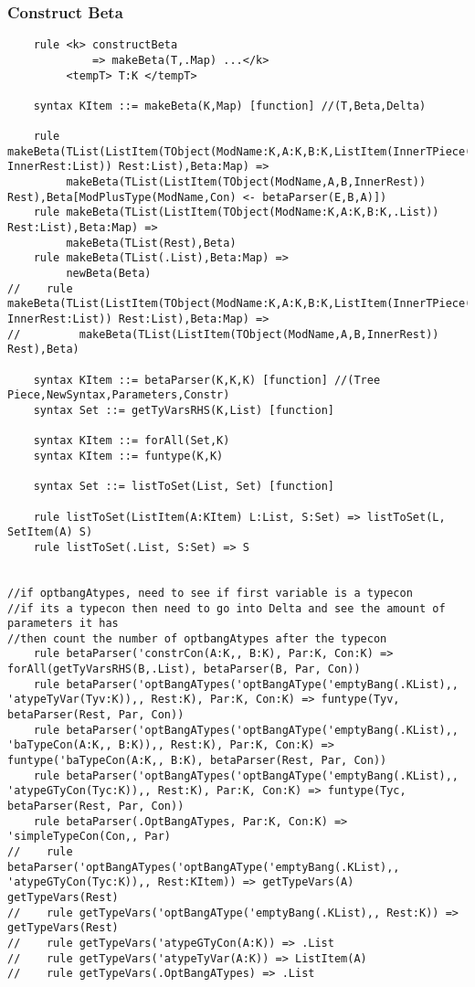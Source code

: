 \subsubsection{Construct Beta}
\begin{lstlisting}
    rule <k> constructBeta
             => makeBeta(T,.Map) ...</k>
         <tempT> T:K </tempT>

    syntax KItem ::= makeBeta(K,Map) [function] //(T,Beta,Delta)

    rule makeBeta(TList(ListItem(TObject(ModName:K,A:K,B:K,ListItem(InnerTPiece(Con:K,H:K,D:K,E:K,F:K)) InnerRest:List)) Rest:List),Beta:Map) =>
         makeBeta(TList(ListItem(TObject(ModName,A,B,InnerRest)) Rest),Beta[ModPlusType(ModName,Con) <- betaParser(E,B,A)])
    rule makeBeta(TList(ListItem(TObject(ModName:K,A:K,B:K,.List)) Rest:List),Beta:Map) =>
         makeBeta(TList(Rest),Beta)
    rule makeBeta(TList(.List),Beta:Map) =>
         newBeta(Beta)
//    rule makeBeta(TList(ListItem(TObject(ModName:K,A:K,B:K,ListItem(InnerTPiece(C:K,H:K,D:K,E:K,F:K)) InnerRest:List)) Rest:List),Beta:Map) =>
//         makeBeta(TList(ListItem(TObject(ModName,A,B,InnerRest)) Rest),Beta)

    syntax KItem ::= betaParser(K,K,K) [function] //(Tree Piece,NewSyntax,Parameters,Constr)
    syntax Set ::= getTyVarsRHS(K,List) [function]

    syntax KItem ::= forAll(Set,K)
    syntax KItem ::= funtype(K,K)

    syntax Set ::= listToSet(List, Set) [function]

    rule listToSet(ListItem(A:KItem) L:List, S:Set) => listToSet(L, SetItem(A) S)
    rule listToSet(.List, S:Set) => S


//if optbangAtypes, need to see if first variable is a typecon
//if its a typecon then need to go into Delta and see the amount of parameters it has
//then count the number of optbangAtypes after the typecon
    rule betaParser('constrCon(A:K,, B:K), Par:K, Con:K) => forAll(getTyVarsRHS(B,.List), betaParser(B, Par, Con))
    rule betaParser('optBangATypes('optBangAType('emptyBang(.KList),, 'atypeTyVar(Tyv:K)),, Rest:K), Par:K, Con:K) => funtype(Tyv, betaParser(Rest, Par, Con))
    rule betaParser('optBangATypes('optBangAType('emptyBang(.KList),, 'baTypeCon(A:K,, B:K)),, Rest:K), Par:K, Con:K) => funtype('baTypeCon(A:K,, B:K), betaParser(Rest, Par, Con))
    rule betaParser('optBangATypes('optBangAType('emptyBang(.KList),, 'atypeGTyCon(Tyc:K)),, Rest:K), Par:K, Con:K) => funtype(Tyc, betaParser(Rest, Par, Con))
    rule betaParser(.OptBangATypes, Par:K, Con:K) => 'simpleTypeCon(Con,, Par)
//    rule betaParser('optBangATypes('optBangAType('emptyBang(.KList),, 'atypeGTyCon(Tyc:K)),, Rest:KItem)) => getTypeVars(A) getTypeVars(Rest)
//    rule getTypeVars('optBangAType('emptyBang(.KList),, Rest:K)) => getTypeVars(Rest)
//    rule getTypeVars('atypeGTyCon(A:K)) => .List
//    rule getTypeVars('atypeTyVar(A:K)) => ListItem(A)
//    rule getTypeVars(.OptBangATypes) => .List


\end{lstlisting}
